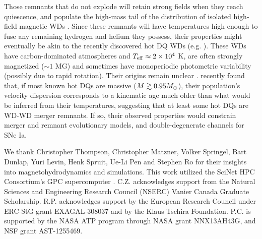 Those remnants that do not explode will retain strong fields when they reach quiescence, and populate the high-mass tail of the distribution of isolated high-field magnetic WDs \citep{garc+12,kule+13,wicktf14,brig+15}.  Since these remnants will have temperatures high enough to fuse any remaining hydrogen and helium they possess, their properties might eventually be akin to the recently discovered hot DQ WDs (e.g. \citealt{dufo+13}).  These WDs have carbon-dominated atmospheres and $T_\mathrm{eff} \approx 2\times10^4$ K, are often strongly magnetized ($\sim1$ MG) and sometimes have monoperiodic photometric variability (possibly due to rapid rotation).  Their origins remain unclear \citep{alth+09, lawr+13, will+13}.  \cite{dunlc15} recently found that, if most known hot DQs are massive ($M \gtrsim 0.95\Msun$), their population's velocity dispersion corresponds to a kinematic age much older than what would be inferred from their temperatures, suggesting that at least some hot DQs are WD-WD merger remnants.  If so, their observed properties would constrain merger and remnant evolutionary models, and double-degenerate channels for SNe Ia.

\vspace{5mm}

We thank Christopher Thompson, Christopher Matzner, Volker Springel, Bart Dunlap, Yuri Levin, Henk Spruit, Ue-Li Pen and Stephen Ro for their insights into magnetohydrodynamics and simulations.  This work utilized the SciNet HPC Consortium's GPC supercomputer \citep{loke+10}.  C.Z. acknowledges support from the Natural Sciences and Engineering Research Council (NSERC) Vanier Canada Graduate Scholarship.  R.P. acknowledges support by the European Research Council under ERC-StG grant EXAGAL-308037 and by the Klaus Tschira Foundation.  P.C. is supported by the NASA ATP program through NASA grant NNX13AH43G, and NSF grant AST-1255469.  
